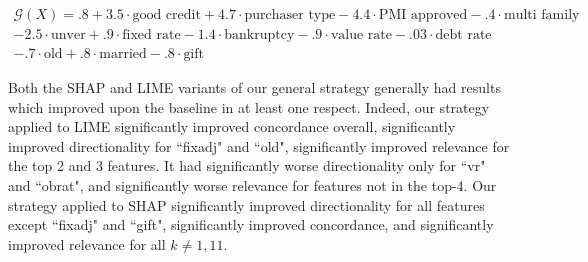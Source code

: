 \documentclass[mnsc,blindrev]{informs3}
\begin{document}
    \begin{equation}
    \label{eqn:econ_gt}
    \begin{split}
        \mathcal{G}(X) =.8 + 3.5\cdot \text{good credit} + 4.7\cdot \text{purchaser type} -4.4 \cdot \text{PMI approved} - .4 \cdot \text{multi family} \\ -2.5 \cdot \text{unver} + .9 \cdot \text{fixed rate} - 1.4 \cdot \text{bankruptcy} - .9 \cdot \text{value rate} - .03 \cdot \text{debt rate} \\- .7 \cdot \text{old} + .8 \cdot \text{married} - .8 \cdot \text{gift}
    \end{split}
    \end{equation}

    Both the SHAP and LIME variants of our general strategy generally had results which improved upon the baseline in at least one respect. Indeed, our strategy applied to LIME significantly improved concordance overall, significantly improved directionality for ``fixadj" and ``old", significantly improved relevance for the top 2 and 3 features. It had significantly worse directionality only for ``vr" and ``obrat", and significantly worse relevance for features not in the top-4. Our strategy applied to SHAP significantly improved directionality for all features except ``fixadj" and ``gift", significantly improved concordance, and significantly improved relevance for all $k\neq 1,11$. 
    
     
\end{document}
